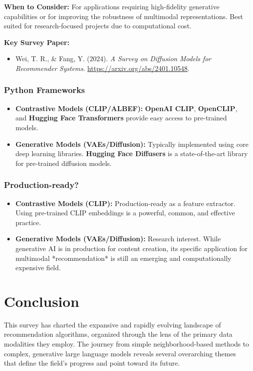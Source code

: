\documentclass{article}
\begin{document}
\noindent\textbf{When to Consider:} For applications requiring high-fidelity generative capabilities or for improving the robustness of multimodal representations. Best suited for research-focused projects due to computational cost.

\noindent\textbf{Key Survey Paper:}
    \begin{itemize}
        \item Wei, T. R., \& Fang, Y. (2024). \textit{A Survey on Diffusion Models for Recommender Systems}. \url{https://arxiv.org/abs/2401.10548}.
    \end{itemize}
    
    \subsubsection*{Python Frameworks}
    \begin{itemize}
        \item \textbf{Contrastive Models (CLIP/ALBEF):} \textbf{OpenAI CLIP}, \textbf{OpenCLIP}, and \textbf{Hugging Face Transformers} provide easy access to pre-trained models.
        \item \textbf{Generative Models (VAEs/Diffusion):} Typically implemented using core deep learning libraries. \textbf{Hugging Face Diffusers} is a state-of-the-art library for pre-trained diffusion models.
    \end{itemize}
    
    \subsubsection*{Production-ready?}
    \begin{itemize}
        \item \textbf{Contrastive Models (CLIP):} Production-ready as a feature extractor. Using pre-trained CLIP embeddings is a powerful, common, and effective practice.
        \item \textbf{Generative Models (VAEs/Diffusion):} Research interest. While generative AI is in production for content creation, its specific application for multimodal *recommendation* is still an emerging and computationally expensive field.
    \end{itemize}

    \section{Conclusion}
    This survey has charted the expansive and rapidly evolving landscape of recommendation algorithms, organized through the lens of the primary data modalities they employ. The journey from simple neighborhood-based methods to complex, generative large language models reveals several overarching themes that define the field's progress and point toward its future.
\end{document}
